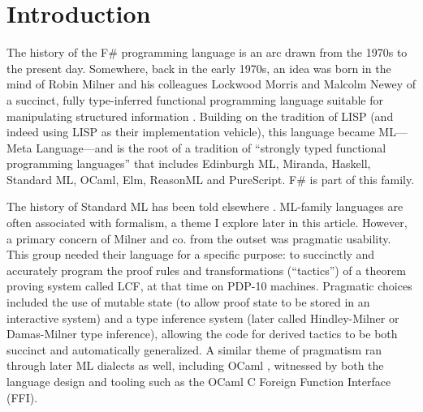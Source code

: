 \documentclass[acmsmall,screen]{acmart}
\begin{document}




\maketitle


\section*{Introduction}

The history of the F\# programming language is an arc drawn from the 1970s to the present day.  Somewhere, back in
the early 1970s, an idea was born in the mind of Robin Milner and his colleagues Lockwood Morris and Malcolm Newey of a
succinct, fully type-inferred functional programming language suitable for manipulating structured information \citep{Gordon2000}.  Building
on the tradition of LISP (and indeed using LISP as their implementation vehicle), this language became ML---Meta Language---and
is the root of a tradition of ``strongly typed functional programming languages'' that includes Edinburgh ML, Miranda, Haskell,
Standard ML, OCaml, Elm, ReasonML and PureScript. F\# is part of this family.

The history of Standard ML has been told elsewhere \citep{MacQueen2015}. ML-family languages are often associated with
formalism, a theme I explore later in this article. However, a primary concern of Milner and co. from the outset was pragmatic
usability. This group needed their language for a specific purpose: to succinctly and accurately program the proof rules and
transformations (``tactics'') of a theorem proving system called LCF, at that time on PDP-10 machines. Pragmatic choices
included the use of mutable state (to allow proof state to be stored in an interactive system) and a type inference
system (later called Hindley-Milner or Damas-Milner type inference), allowing the code for derived tactics to be both
succinct and automatically generalized.  A similar theme of pragmatism ran through later ML dialects as well, including
OCaml \citep{Leroy2014}, witnessed by both the language design and tooling such as the OCaml C Foreign Function Interface (FFI).
\end{document}
